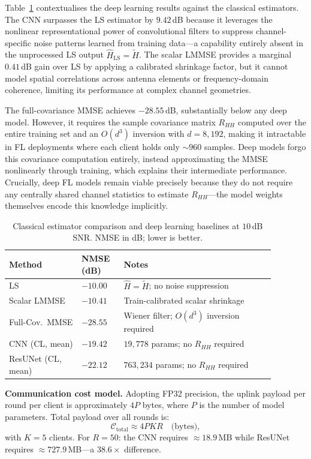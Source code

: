 \documentclass[runningheads]{llncs}
\begin{document}
Table~\ref{tab:classical} contextualises the deep learning results
against the classical estimators.  The CNN surpasses the LS estimator
by $9.42$\,dB because it leverages the nonlinear representational power
of convolutional filters to suppress channel-specific noise patterns
learned from training data---a capability entirely absent in the
unprocessed LS output $\hat{H}_\mathrm{LS} = \tilde{H}$.  The scalar
LMMSE provides a marginal $0.41$\,dB gain over LS by applying a
calibrated shrinkage factor, but it cannot model spatial correlations
across antenna elements or frequency-domain coherence, limiting its
performance at complex channel geometries.

The full-covariance MMSE achieves $-28.55$\,dB, substantially below
any deep model.  However, it requires the sample covariance matrix
$R_{HH}$ computed over the entire training set and an $O(d^3)$
inversion with $d = 8{,}192$, making it intractable in FL deployments
where each client holds only $\sim 960$ samples.  Deep models forgo
this covariance computation entirely, instead approximating the MMSE
nonlinearly through training, which explains their intermediate
performance.  Crucially, deep FL models remain viable precisely because
they do not require any centrally shared channel statistics to estimate
$R_{HH}$---the model weights themselves encode this knowledge
implicitly.

\begin{table}[htbp]
\caption{Classical estimator comparison and deep learning baselines at
  $10$\,dB SNR.  NMSE in dB; lower is better.}
\label{tab:classical}
\centering
\begin{tabular}{p{0.24\linewidth}p{0.14\linewidth}p{0.50\linewidth}}
\toprule
Method & NMSE (dB) & Notes \\
\midrule
LS             & $-10.00$ & $\hat{H} = \tilde{H}$; no noise suppression \\
Scalar LMMSE   & $-10.41$ & Train-calibrated scalar shrinkage \\
Full-Cov.\ MMSE & $-28.55$ & Wiener filter; $O(d^3)$ inversion required \\
\midrule
CNN (CL, mean) & $-19.42$ & $19{,}778$ params; no $R_{HH}$ required \\
ResUNet (CL, mean) & $-22.12$ & $763{,}234$ params; no $R_{HH}$ required \\
\bottomrule
\end{tabular}
\end{table}

\textbf{Communication cost model.}  Adopting FP32 precision, the uplink
payload per round per client is approximately $4P$ bytes, where $P$ is
the number of model parameters.  Total payload over all rounds is:
\begin{equation}
  \mathcal{C}_\mathrm{total} \approx 4PKR \quad \text{(bytes)},
  \label{eq:comm}
\end{equation}
with $K = 5$ clients.  For $R = 50$: the CNN requires $\approx 18.9$\,MB
while ResUNet requires $\approx 727.9$\,MB---a $38.6\times$ difference.
\end{document}
